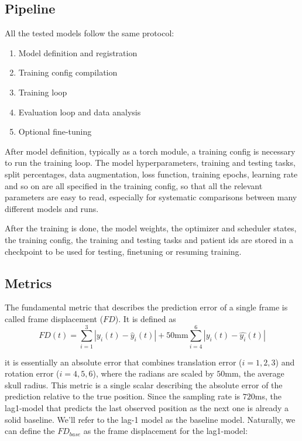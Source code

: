 \documentclass[
reprint,
aps,
prd,
superscriptaddress,
nofootinbib
]{revtex4-2}
\begin{document}
\subsection{Pipeline}

All the tested models follow the same protocol:
\begin{enumerate}
    \item Model definition and registration
    \item Training config compilation
    \item Training loop
    \item Evaluation loop and data analysis
    \item Optional fine-tuning
\end{enumerate}

After model definition, typically as a torch module, a training config is necessary to run the training loop. The model hyperparameters, training and testing tasks, split percentages, data augmentation, loss function, training epochs, learning rate and so on are all specified in the training config, so that all the relevant parameters are easy to read, especially for systematic comparisons between many different models and runs.

After the training is done, the model weights, the optimizer and scheduler states, the training config, the training and testing tasks and patient ids are stored in a checkpoint to be used for testing, finetuning or resuming training. 

\subsection{Metrics}

The fundamental metric that describes the prediction error of a single frame is called frame displacement ($FD$). It is defined as
\begin{equation}
    FD(t) = \sum_{i=1}^3 |y_i(t) - \hat{y}_i(t)| + 50 \text{mm} \sum_{i=4}^6 |y_i(t) - \hat{y_i}(t)|
\end{equation}

it is essentially an absolute error that combines translation error ($i=1,2,3$) and rotation error ($i=4,5,6$), where the radians are scaled by $50$mm, the average skull radius.
This metric is a single scalar describing the absolute error of the prediction relative to the true position. Since the sampling rate is $720$ms, the lag1-model that predicts the last observed position as the next one is already a solid baseline. We'll refer to the lag-1 model as the baseline model. Naturally, we can define the $FD_{base}$ as the frame displacement for the lag1-model:
\end{document}
